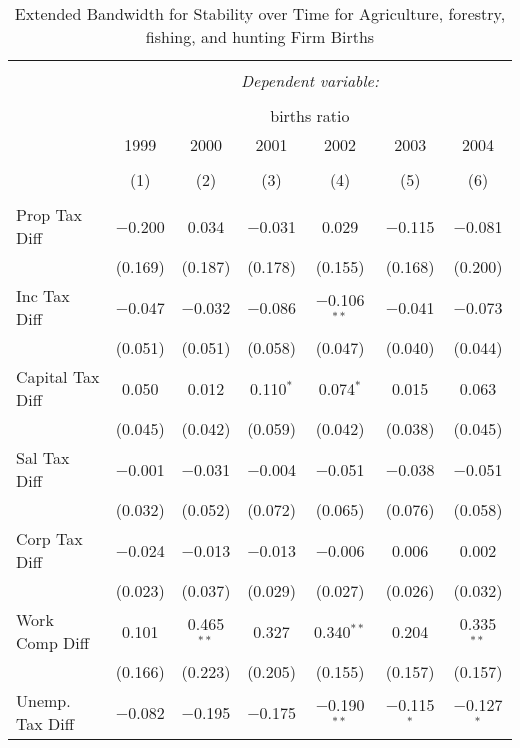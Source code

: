 
\begin{table}[!htbp] \centering 
  \caption{Extended Bandwidth for Stability over Time for  Agriculture, forestry, fishing, and hunting Firm Births} 
  \label{11 ebyear} 
\small 
\begin{tabular}{@{\extracolsep{5pt}}lcccccc} 
\\[-1.8ex]\hline 
\hline \\[-1.8ex] 
 & \multicolumn{6}{c}{\textit{Dependent variable:}} \\ 
\cline{2-7} 
\\[-1.8ex] & \multicolumn{6}{c}{births ratio} \\ 
 & 1999 & 2000 & 2001 & 2002 & 2003 & 2004 \\ 
\\[-1.8ex] & (1) & (2) & (3) & (4) & (5) & (6)\\ 
\hline \\[-1.8ex] 
 Prop Tax Diff & $-$0.200 & 0.034 & $-$0.031 & 0.029 & $-$0.115 & $-$0.081 \\ 
  & (0.169) & (0.187) & (0.178) & (0.155) & (0.168) & (0.200) \\ 
  Inc Tax Diff & $-$0.047 & $-$0.032 & $-$0.086 & $-$0.106$^{**}$ & $-$0.041 & $-$0.073 \\ 
  & (0.051) & (0.051) & (0.058) & (0.047) & (0.040) & (0.044) \\ 
  Capital Tax Diff & 0.050 & 0.012 & 0.110$^{*}$ & 0.074$^{*}$ & 0.015 & 0.063 \\ 
  & (0.045) & (0.042) & (0.059) & (0.042) & (0.038) & (0.045) \\ 
  Sal Tax Diff & $-$0.001 & $-$0.031 & $-$0.004 & $-$0.051 & $-$0.038 & $-$0.051 \\ 
  & (0.032) & (0.052) & (0.072) & (0.065) & (0.076) & (0.058) \\ 
  Corp Tax Diff & $-$0.024 & $-$0.013 & $-$0.013 & $-$0.006 & 0.006 & 0.002 \\ 
  & (0.023) & (0.037) & (0.029) & (0.027) & (0.026) & (0.032) \\ 
  Work Comp Diff & 0.101 & 0.465$^{**}$ & 0.327 & 0.340$^{**}$ & 0.204 & 0.335$^{**}$ \\ 
  & (0.166) & (0.223) & (0.205) & (0.155) & (0.157) & (0.157) \\ 
  Unemp. Tax Diff & $-$0.082 & $-$0.195 & $-$0.175 & $-$0.190$^{**}$ & $-$0.115$^{*}$ & $-$0.127$^{*}$ \\ 

\end{tabular}
\end{table}
